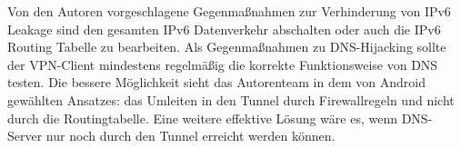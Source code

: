 Von den Autoren vorgeschlagene Gegenmaßnahmen zur Verhinderung von IPv6 Leakage sind
 den gesamten IPv6 Datenverkehr abschalten oder auch die IPv6 Routing Tabelle zu bearbeiten. 
 Als Gegenmaßnahmen zu DNS-Hijacking sollte der VPN-Client mindestens regelmäßig die korrekte Funktionsweise von DNS testen. Die bessere Möglichkeit sieht das Autorenteam in dem von Android gewählten Ansatzes: das Umleiten in den Tunnel durch Firewallregeln und nicht durch die Routingtabelle. Eine weitere effektive Lösung wäre es, wenn DNS-Server nur noch durch den Tunnel erreicht werden können. 
  


 






